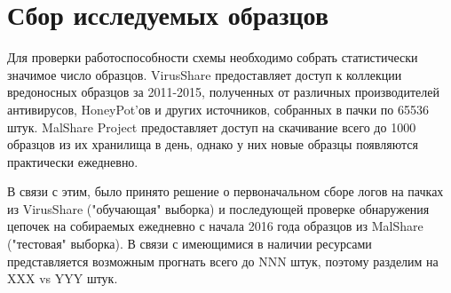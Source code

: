 \section {Сбор исследуемых образцов}
Для проверки работоспособности схемы необходимо собрать статистически значимое число образцов. 
VirusShare \cite{VIRUSSHARE} предоставляет доступ к коллекции вредоносных образцов за 2011-2015, полученных от различных производителей антивирусов, HoneyPot'ов и других источников, собранных в пачки по 65536 штук.
MalShare Project \cite{MALSHARE} предоставляет доступ на скачивание  всего до 1000 образцов из их хранилища в день, однако у них новые образцы появляются практически ежедневно.

В связи с этим, было принято решение о первоначальном сборе логов на пачках из VirusShare ("обучающая" выборка) и последующей проверке обнаружения цепочек на собираемых ежедневно с начала 2016 года образцов из MalShare ("тестовая" выборка). В связи с имеющимися в наличии ресурсами представляется возможным прогнать всего до NNN штук, поэтому разделим на XXX vs YYY штук.

